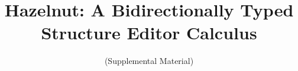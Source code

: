 \documentclass{llncs}
\begin{document}
%
\frontmatter          %

\mainmatter              %
%
\title{Hazelnut: A Bidirectionally Typed \\ Structure Editor Calculus}
\subtitle{(Supplemental Material)}
%
%
\author{~}
%
\authorrunning{~} %
%
%
\institute{~
}



\maketitle              %
%
% 
\end{document}
